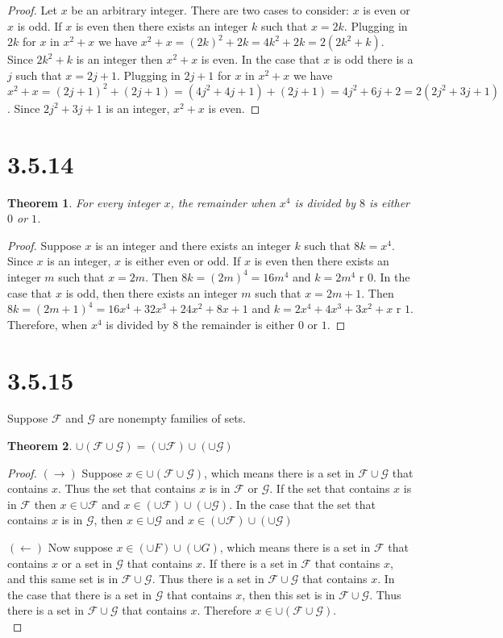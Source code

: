 \documentclass{article}
\newcommand{\F}{\mathcal{F}}
\newcommand{\G}{\mathcal{G}}
\newtheorem*{theorem}{Theorem}  %
\begin{document}
\begin{proof}
Let $x$ be an arbitrary integer. There are two cases to consider: $x$ is even or $x$ is odd. If $x$ is even then there exists an integer $k$ such that $x = 2k$. Plugging in $2k$ for $x$ in $x^2 + x$ we have $x^2 + x = (2k)^2 + 2k = 4k^2 + 2k = 2(2k^2 + k)$. Since $2k^2 + k$ is an integer then $x^2 + x$ is even. In the case that $x$ is odd there is a $j$ such that $x = 2j + 1$. Plugging in $2j +1$ for $x$ in $x^2 + x$ we have $x^2 + x = (2j + 1)^2 + (2j + 1) = (4j^2 + 4j + 1) + (2j + 1) = 4j^2 + 6j + 2 = 2(2j^2 + 3j + 1)$. Since $2j^2 + 3j + 1$ is an integer, $x^2 + x$ is even.
\end{proof}

\section*{3.5.14}
\begin{theorem} For every integer $x$, the remainder when $x^4$ is divided by $8$ is either $0$ or $1$.
\end{theorem}

\begin{proof}
Suppose $x$ is an integer and there exists an integer $k$ such that $8k = x^4$. Since $x$ is an integer, $x$ is either even or odd. If $x$ is even then there exists an integer $m$ such that $x=2m$. Then $8k = (2m)^4 = 16m^4$ and $k = 2m^4$ r $0$. In the case that $x$ is odd, then there exists an integer $m$ such that $x = 2m + 1$. Then $8k = (2m+1)^4 = 16x^4 + 32x^3 + 24x^2 + 8x + 1$ and $k = 2x^4 + 4x^3 + 3x^2 + x$ r $1$. Therefore, when $x^4$ is divided by 8 the remainder is either $0$ or $1$.
\end{proof}

\section*{3.5.15}
Suppose $\F$ and $\G$ are nonempty families of sets.

\begin{theorem} $\cup ( \F \cup \G ) = (\cup \F) \cup (\cup \G)$
\end{theorem}

\begin{proof}
$(\rightarrow)$ Suppose $x \in \cup(\F \cup \G)$, which means there is a set in $\F \cup \G$ that contains $x$. Thus the set that contains $x$ is in $\F$ or $\G$. If the set that contains $x$ is in $\F$ then $x \in \cup \F$ and $x \in (\cup \F) \cup (\cup \G)$. In the case that the set that contains $x$ is in $\G$, then $x \in \cup \G$ and $x \in (\cup \F) \cup (\cup \G)$ 


$(\leftarrow)$ Now suppose $x \in (\cup F) \cup (\cup G)$, which means there is a set in $\F$ that contains $x$ or a set in $\G$ that contains $x$. If there is a set in $\F$ that contains $x$, and this same set is in $\F \cup \G$. Thus there is a set in $\F \cup \G$ that contains $x$. In the case that there is a set in $\G$ that contains $x$, then this set is in $\F \cup \G$. Thus there is a set in $\F \cup \G$ that contains $x$. Therefore $x \in \cup (\F \cup \G)$. \\

\end{proof}
\end{document}
